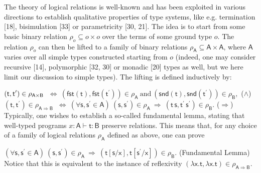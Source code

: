 \documentclass[10pt,a4paper]{amsart}
\begin{document}
The theory of logical relations is well-known and has been exploited in various directions to establish qualitative properties of type systems, like e.g. termination [18], bisimulation [33] or parametricity [30, 21]. The idea is to start from some basic binary relation $\rho_{o}\subseteq o\times o$ over the terms of some ground type $o$. The relation $\rho_{o}$ can then be lifted to a family of binary relations $\rho_{\mathsf{A}}\subseteq\mathsf{A}\times\mathsf{A}$, where $\mathsf{A}$ varies over all simple types constructed starting from $o$ (indeed, one may consider recursive [14], polymorphic [32, 30] or monadic [20] types as well, but we here limit our discussion to simple types). The lifting is defined inductively by:\par
    $\displaystyle(\mathsf{t},\mathsf{t}^{\prime})\in\rho_{\mathsf{A}\times\mathsf{%
B}}$ $\displaystyle\ \iff\ (\mathsf{fst}(\mathsf{t}),\mathsf{fst}(\mathsf{t}^{\prime%
}))\in\rho_{\mathsf{A}}\ \text{and}\ (\mathsf{snd}(\mathsf{t}),\mathsf{snd}(%
\mathsf{t}^{\prime}))\in\rho_{\mathsf{B}},$  ($\land$)    $\displaystyle(\mathsf{t},\mathsf{t}^{\prime})\in\rho_{\mathsf{A}\Rightarrow%
\mathsf{B}}$ $\displaystyle\ \iff\ (\forall\mathsf{s},\mathsf{s}^{\prime}\in\mathsf{A})\ (%
\mathsf{s},\mathsf{s}^{\prime})\in\rho_{\mathsf{A}}\ \Rightarrow\ (\mathsf{t}%
\,\mathsf{s},\mathsf{t^{\prime}}\,\mathsf{s^{\prime}})\in\rho_{\mathsf{B}}.$  ($\Rightarrow$)   
Typically, one wishes to establish a so-called fundamental lemma, stating that well-typed programs $x:\mathsf{A}\vdash\mathsf{t}:\mathsf{B}$ preserve relations. This means that, for any choice of a family of logical relations $\rho_{\mathsf{A}}$ defined as above, one can prove\par
    $\displaystyle(\forall\mathsf{s},\mathsf{s}^{\prime}\in\mathsf{A})\ (\mathsf{s}%
,\mathsf{s}^{\prime})\in\rho_{\mathsf{A}}\ \Rightarrow\ (\mathsf{t}[\mathsf{s}%
/\mathsf{x}],\mathsf{t}[\mathsf{s}^{\prime}/\mathsf{x}])\in\rho_{\mathsf{B}}.$  (Fundamental Lemma)   
Notice that this is equivalent to the instance of reflexivity $(\lambda\mathsf{x}.\mathsf{t},\lambda\mathsf{x}.\mathsf{t})\in\rho_{\mathsf{A}%
\Rightarrow\mathsf{B}}$.\par
 
 
 
\end{document}
